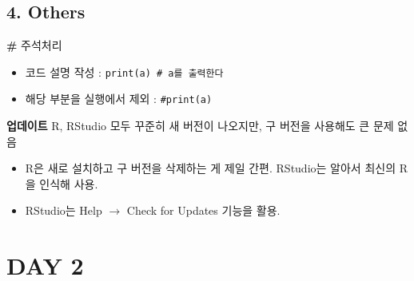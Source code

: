 \documentclass[
  12,
]{article}
\begin{document}
\hypertarget{others}{%
\subsection{4. Others}\label{others}}

\textbf{\#} 주석처리

\begin{itemize}
\item
  코드 설명 작성 : \texttt{print(a)\ \#\ a를\ 출력한다}
\item
  해당 부분을 실행에서 제외 : \texttt{\#print(a)}
\end{itemize}

\textbf{업데이트} R, RStudio 모두 꾸준히 새 버전이 나오지만, 구 버전을
사용해도 큰 문제 없음

\begin{itemize}
\item
  R은 새로 설치하고 구 버전을 삭제하는 게 제일 간편. RStudio는 알아서
  최신의 R을 인식해 사용.
\item
  RStudio는 Help \(\to\) Check for Updates 기능을 활용.
\end{itemize}

\hypertarget{day-2}{%
\section{DAY 2}\label{day-2}}
\end{document}
